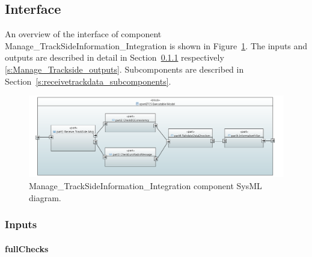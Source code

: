 \subsection{Interface}

An overview of the interface of component Manage\_TrackSideInformation\_Integration is shown in Figure~\ref{f:receiveAndCheckConsistencyArch}. The inputs and outputs are described in detail in Section~\ref{s:Manage_Trackside_inputs} respectively \ref{s:Manage_Trackside_outputs}. Subcomponents are described in Section~\ref{s:receivetrackdata_subcomponents}.

\begin{figure}
\center
\includegraphics[width=\textwidth]{./images/Input-Messages4.PNG}
\caption{Manage\_TrackSideInformation\_Integration component SysML diagram.}\label{f:receiveAndCheckConsistencyArch}
\end{figure}


\subsubsection{Inputs}\label{s:Manage_Trackside_inputs}

\paragraph{fullChecks}

